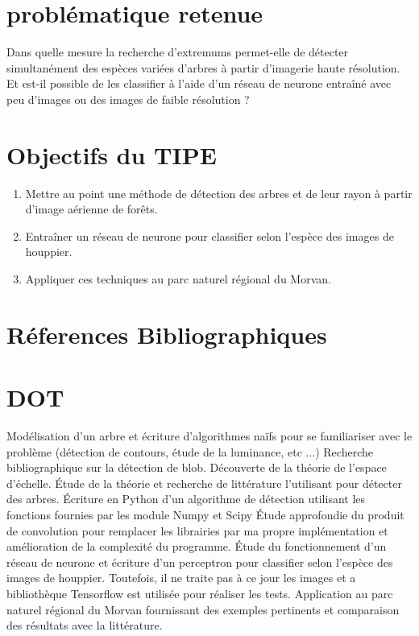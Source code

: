 \documentclass{article}
\begin{document}
\section{problématique retenue}

Dans quelle mesure la recherche d'extremums permet-elle de détecter simultanément des espèces variées d'arbres à partir d'imagerie haute résolution. Et est-il possible de les classifier à l'aide d'un réseau de neurone entraîné avec peu d'images ou des images de faible résolution ? 

\section{Objectifs du TIPE}

\begin{enumerate}
	\item Mettre au point une méthode de détection des arbres et de leur rayon à partir d'image aérienne de forêts.  
    \item Entraîner un réseau de neurone pour classifier selon l'espèce des images de houppier.
	\item Appliquer ces techniques au parc naturel régional du Morvan.   
\end{enumerate}
	
\section{Réferences Bibliographiques}

\section{DOT}

Modélisation d'un arbre et écriture d'algorithmes naïfs pour se familiariser avec le problème (détection de contours, étude de la luminance, etc ...)
Recherche bibliographique sur la détection de blob. Découverte de la théorie de l'espace d'échelle.
Étude de la théorie et recherche de littérature l'utilisant pour détecter des arbres.
Écriture en Python d'un algorithme de détection utilisant les fonctions fournies par les module Numpy et Scipy 
Étude approfondie du produit de convolution pour remplacer les librairies par ma propre implémentation et amélioration de la complexité du programme. 
Étude du fonctionnement d'un réseau de neurone et écriture d'un perceptron pour classifier selon l'espèce des images de houppier. Toutefois, il ne traite pas à ce jour les images et a bibliothèque Tensorflow est utilisée pour réaliser les tests.
Application au parc naturel régional du Morvan fournissant des exemples pertinents et comparaison des résultats avec la littérature.
\end{document}
